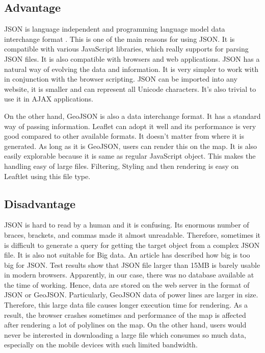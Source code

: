 \subsection{Advantage}

JSON is language independent and programming language model data interchange format \cite{jsonfatfree2006}. This is one of the main reasons for using JSON. It is compatible with various JavaScript libraries, which really supports for parsing JSON files. It is also compatible with browsers and web applications. JSON has a natural way of evolving the data and information. It is very simpler to work with in conjunction with the browser scripting. JSON can be imported into any website, it is smaller and can represent all Unicode characters. It's also trivial to use it in AJAX applications.
 
On the other hand, GeoJSON is also a data interchange format. It has a standard way of passing information. Leaflet can adopt it well and its performance is very good compared to other available formats. It doesn't matter from where it is generated. As long as it is GeoJSON, users can render this on the map. It is also easily explorable because it is same as regular JavaScript object. This makes the handling easy of large files. Filtering, Styling and then rendering is easy on Leaftlet using this file type.

\subsection{Disadvantage}

JSON is hard to read by a human and it is confusing. Its enormous number of braces, brackets, and commas made it almost unreadable. Therefore, sometimes it is difficult to generate a query for getting the target object from a complex JSON file. It is also not suitable for Big data.  An article \cite{jsontoobig} has described how big is too big for JSON.  Test results show that JSON file larger than 15MB is barely usable in modern browsers. Apparently, in our case, there was no database available at the time of working. Hence, data are stored on the web server in the format of JSON or GeoJSON. Particularly, GeoJSON data of power lines are larger in size. Therefore, this large data file causes longer execution time for rendering. As a result, the browser crashes sometimes and performance of the map is affected after rendering a lot of polylines on the map. On the other hand, users would never be interested in downloading a large file which consumes so much data, especially on the mobile devices with such limited bandwidth.

